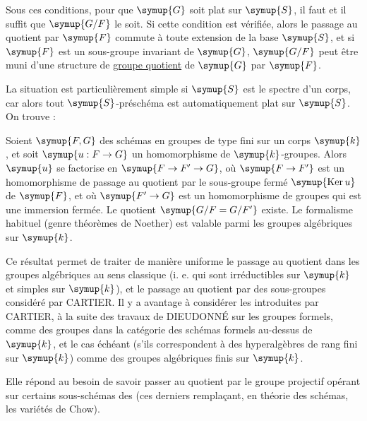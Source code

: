  Sous ces conditions, pour que $\symup{G}$ soit plat sur $\symup{S}$,
il faut et il suffit que $\symup{G/F}$ le soit. Si cette condition est vérifiée, alors
le passage au quotient par $\symup{F}$ commute à toute extension de la base $\symup{S}$, et
si $\symup{F}$ est un sous-groupe invariant de $\symup{G}$, $\symup{G/F}$ peut être muni d'une
structure de \uline{groupe quotient} de $\symup{G}$ par $\symup{F}$.

La situation est particulièrement simple si $\symup{S}$ est le spectre d'un corps, car
alors tout $\symup{S}$-préschéma est automatiquement plat sur $\symup{S}$. On trouve :

 Soient $\symup{F,G}$ des schémas en groupes de type fini sur
un corps $\symup{k}$, et soit $\symup{u:F\to G}$ un homomorphisme de $\symup{k}$-groupes. Alors $\symup{u}$ se
factorise en $\symup{F\to F'\to G}$, où $\symup{F\to F'}$ est un homomorphisme de passage au
quotient par le sous-groupe fermé $\symup{\operatorname{Ker}u}$ de $\symup{F}$, et où
$\symup{F'\to G}$ est un homomorphisme de groupes qui est une immersion fermée. Le
quotient $\symup{G/F=G/F'}$ existe. Le formalisme habituel (genre théorèmes de Noether)
est valable parmi les groupes algébriques sur $\symup{k}$.

Ce résultat permet de traiter de manière uniforme le passage au quotient dans
les groupes algébriques au sens classique (i. e. qui sont irréductibles sur $\symup{k}$
et simples sur $\symup{k}$), et le passage au quotient par des sous-groupes
considéré par CARTIER. Il y a avantage à considérer les 
introduites par CARTIER, à la suite des travaux de DIEUDONNÉ sur les groupes
formels, comme des groupes dans la catégorie des schémas formels au-dessus de
$\symup{k}$, et le cas échéant (s'ils correspondent à des hyperalgèbres de rang fini
sur $\symup{k}$) comme des groupes algébriques finis sur $\symup{k}$.


Elle répond au besoin de savoir passer au quotient par le groupe projectif
opérant sur certains sous-schémas des  (ces derniers
remplaçant, en théorie des schémas, les variétés de Chow).

